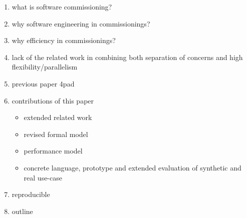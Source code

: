 \begin{enumerate}
\item what is software commissioning?
\item why software engineering in commissionings?
\item why efficiency in commissionings?
\item lack of the related work in combining both separation of
concerns and high flexibility/parallelism
\item previous paper 4pad
\item contributions of this paper
\begin{itemize}
\item extended related work
\item revised formal model
\item performance model
\item concrete language, prototype and extended evaluation of
synthetic and real use-case
\end{itemize}
\item reproducible
\item outline
\end{enumerate}

